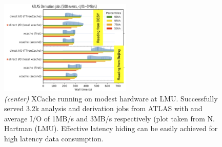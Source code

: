 \begin{figure}[h]
  \centering
  \includegraphics[height=4.5cm]{lmu.png}
  \caption{{\em (center)} XCache running on modest hardware at LMU. Successfully served 3.2k analysis and derivation jobs from ATLAS with and average I/O of 1MB/s and 3MB/s respectively (plot taken from N. Hartman (LMU). Effective latency hiding can be easily achieved for high latency data consumption.}
  \label{lmu-xcache}
\end{figure}




